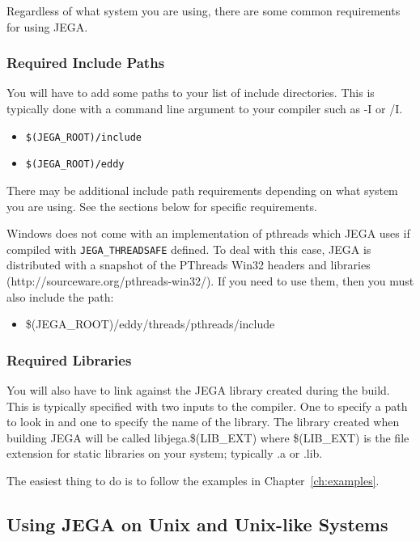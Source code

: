 Regardless of what system you are using, there are some common
requirements for using JEGA.

\subsubsection{Required Include Paths}\label{sec:req_incl_paths}

You will have to add some paths to your list of include directories.
This is typically done with a command line argument to your compiler
such as -I or /I.

\begin{itemize}
\item \texttt{\$(JEGA\_ROOT)/include}
\item \texttt{\$(JEGA\_ROOT)/eddy}
\end{itemize}

There may be additional include path requirements depending on what
system you are using.  See the sections below for specific
requirements.

Windows does not come with an implementation of pthreads which JEGA
uses if compiled with \texttt{JEGA\_THREADSAFE} defined. To deal
with this case, JEGA is distributed with a snapshot of the PThreads
Win32 headers and libraries (http://sourceware.org/pthreads-win32/).
If you need to use them, then you must also include the path:

\begin{itemize}
\item \$(JEGA\_ROOT)/eddy/threads/pthreads/include
\end{itemize}

\subsubsection{Required Libraries}\label{sec:req_libs}

You will also have to link against the JEGA library created during
the build. This is typically specified with two inputs to the
compiler. One to specify a path to look in and one to specify the
name of the library. The library created when building JEGA will be
called libjega.\$(LIB\_EXT) where \$(LIB\_EXT) is the file extension
for static libraries on your system; typically .a or .lib.


The easiest thing to do is to follow the examples in
Chapter~\ref{ch:examples}.

\subsection{Using JEGA on Unix and Unix-like Systems}\label{sec:using_on_unix}

